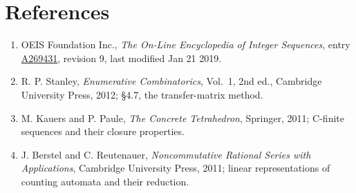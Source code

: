 \documentclass[11pt]{article}
\theoremstyle{definition}
\begin{document}
\section{References}

\begin{enumerate}

\item OEIS Foundation Inc., \emph{The On-Line Encyclopedia of Integer Sequences}, entry \href{https://oeis.org/A269431}{A269431}, revision 9, last modified Jan 21 2019.

\item R. P. Stanley, \emph{Enumerative Combinatorics}, Vol.~1, 2nd ed., Cambridge University Press, 2012; \S4.7, the transfer-matrix method.

\item M. Kauers and P. Paule, \emph{The Concrete Tetrahedron}, Springer, 2011; C-finite sequences and their closure properties.

\item J. Berstel and C. Reutenauer, \emph{Noncommutative Rational Series with Applications}, Cambridge University Press, 2011; linear representations of counting automata and their reduction.

\end{enumerate}
\end{document}
